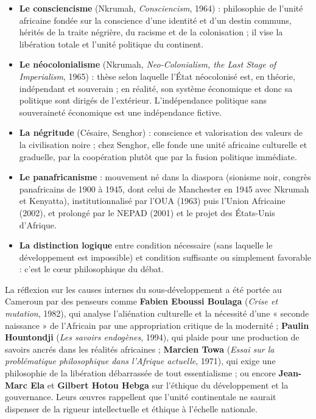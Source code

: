 \documentclass[11pt]{article}
\newcommand{\cle}[1]{{\popxbold\color{popdark}#1}}
\newcounter{popsec}
\newcounter{popsub}
\newcommand{\courssub}[1]{%
  \stepcounter{popsub}%
  \par\vspace{9pt}\noindent{\popxbold\fontsize{11.5}{13}\selectfont\color{popink}{\color{poporange}\thepopsec.\thepopsub}\hspace{6pt}#1}\par\nopagebreak\vspace{4pt}
}
\begin{document}
\courssub{Ressources à mobiliser}

\begin{aretenir}
\begin{itemize}
\item \textbf{Le consciencisme} (Nkrumah, \emph{Consciencism}, 1964) : philosophie de l'unité africaine fondée sur la conscience d'une identité et d'un destin communs, hérités de la traite négrière, du racisme et de la colonisation ; il vise la libération totale et l'unité politique du continent.
\item \textbf{Le néocolonialisme} (Nkrumah, \emph{Neo-Colonialism, the Last Stage of Imperialism}, 1965) : thèse selon laquelle l'État néocolonisé est, en théorie, indépendant et souverain ; en réalité, son système économique et donc sa politique sont dirigés de l'extérieur. L'indépendance politique sans souveraineté économique est une indépendance fictive.
\item \textbf{La négritude} (Césaire, Senghor) : conscience et valorisation des valeurs de la civilisation noire ; chez Senghor, elle fonde une unité africaine culturelle et graduelle, par la coopération plutôt que par la fusion politique immédiate.
\item \textbf{Le panafricanisme} : mouvement né dans la diaspora (sionisme noir, congrès panafricains de 1900 à 1945, dont celui de Manchester en 1945 avec Nkrumah et Kenyatta), institutionnalisé par l'OUA (1963) puis l'Union Africaine (2002), et prolongé par le NEPAD (2001) et le projet des États-Unis d'Afrique.
\item \textbf{La distinction logique} entre condition \cle{nécessaire} (sans laquelle le développement est impossible) et condition \cle{suffisante} ou simplement favorable : c'est le cœur philosophique du débat.
\end{itemize}
\end{aretenir}

\begin{savaistu}
La réflexion sur les causes internes du sous-développement a été portée au Cameroun par des penseurs comme \textbf{Fabien Eboussi Boulaga} (\emph{Crise et mutation}, 1982), qui analyse l'aliénation culturelle et la nécessité d'une « seconde naissance » de l'Africain par une appropriation critique de la modernité ; \textbf{Paulin Hountondji} (\emph{Les savoirs endogènes}, 1994), qui plaide pour une production de savoirs ancrés dans les réalités africaines ; \textbf{Marcien Towa} (\emph{Essai sur la problématique philosophique dans l'Afrique actuelle}, 1971), qui exige une philosophie de la libération débarrassée de tout essentialisme ; ou encore \textbf{Jean-Marc Ela} et \textbf{Gilbert Hotou Hebga} sur l'éthique du développement et la gouvernance. Leurs œuvres rappellent que l'unité continentale ne saurait dispenser de la rigueur intellectuelle et éthique à l'échelle nationale.
\end{savaistu}
\end{document}
